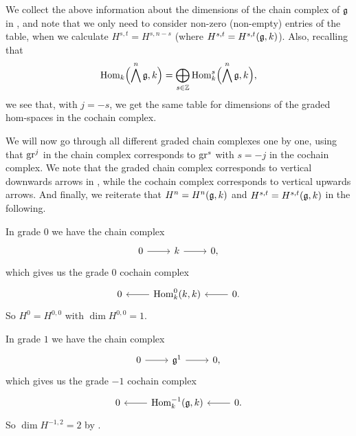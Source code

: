 We collect the above information about the dimensions of the chain complex of $\mathfrak{g}$ in , and note that we only need to consider non-zero (non-empty) entries of the table, when we calculate  $H^{s,t} = H^{s,n-s}$ (where $H^{s,t} = H^{s,t}(\mathfrak{g},k)$). Also, recalling that
\begin{equation*}
  \operatorname{Hom}_{k}\Bigl( \bigwedge^{n}\mathfrak{g}, k \Bigr) = \bigoplus_{s \in \mathbb{Z}} \operatorname{Hom}_{k}^{s}\Bigl( \bigwedge^{n}\mathfrak{g}, k \Bigr),
\end{equation*}
we see that, with $j=-s$, we get the same table for dimensions of the graded hom-spaces in the cochain complex.

We will now go through all different graded chain complexes one by one, using that $\operatorname{gr}^{j}$ in the chain complex corresponds to $\operatorname{gr}^{s}$ with $s = -j$ in the cochain complex. We note that the graded chain complex corresponds to vertical downwards arrows in , while the cochain complex corresponds to vertical upwards arrows. And finally, we reiterate that $H^{n} = H^{n}(\mathfrak{g},k)$ and $H^{s,t} = H^{s,t}(\mathfrak{g},k)$ in the following.

In grade $0$ we have the chain complex
\[
  \begin{tikzcd}
    0 \ar[r] & k \ar[r] & 0,
  \end{tikzcd}
\]
which gives us the grade $0$ cochain complex
\[
  \begin{tikzcd}
    0 & \ar[l] \Hom_{k}^{0}(k,k) & \ar[l] 0.
  \end{tikzcd}
\]
So $H^{0} = H^{0,0}$ with $\dim H^{0,0} = 1$.

In grade $1$ we have the chain complex
\[
  \begin{tikzcd}
    0 \ar[r] & \lie{g}^{1} \ar[r] & 0,
  \end{tikzcd}
\]
which gives us the grade $-1$ cochain complex
\[
  \begin{tikzcd}
    0 & \ar[l] \Hom_{k}^{-1}(\lie{g},k) & \ar[l] 0.
  \end{tikzcd}
\]
So $\dim H^{-1,2} = 2$ by .

